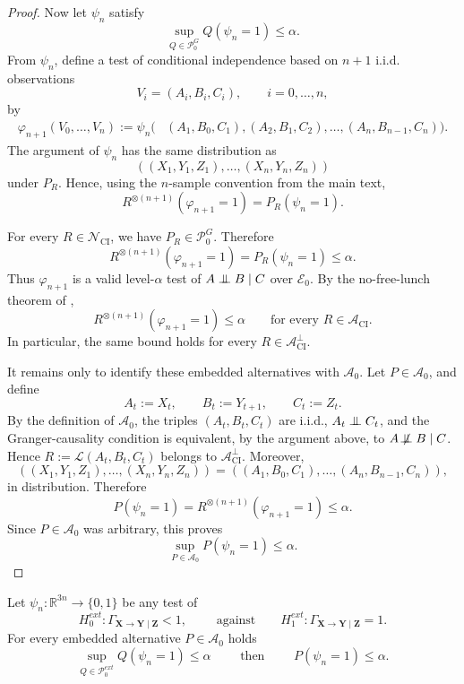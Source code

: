 \documentclass[a4paper,11pt]{article}
\newenvironment{customcorollary}[1]
  {\renewcommand\theinnercustomcorollary{#1}\innercustomcorollary}
  {\endinnercustomcorollary}
\newcommand{\indep}{\perp\kern-5.5pt\perp}
\begin{document}
\begin{proof}
Now let \(\psi_n\) satisfy
\[
    \sup_{Q\in\mathcal P_0^G}Q(\psi_n=1)\le \alpha .
\]
From \(\psi_n\), define a test of conditional independence based on
\(n+1\) i.i.d. observations
\[
    V_i=(A_i,B_i,C_i),\qquad i=0,\ldots,n,
\]
by
\[
\begin{split}
    \varphi_{n+1}(V_0,\ldots,V_n)
    :=
    \psi_n\big(
        &(A_1,B_0,C_1),
          (A_2,B_1,C_2),
          \ldots,
          (A_n,B_{n-1},C_n)
    \big).
\end{split}
\]
The argument of \(\psi_n\) has the same distribution as
\[
    ((X_1,Y_1,Z_1),\ldots,(X_n,Y_n,Z_n))
\]
under \(P_R\). Hence, using the \(n\)-sample convention from the main text,
\[
    R^{\otimes(n+1)}(\varphi_{n+1}=1)
    =
    P_R(\psi_n=1).
\]

For every \(R\in\mathcal N_{\mathrm{CI}}\), we have
\(P_R\in\mathcal P_0^G\). Therefore
\[
    R^{\otimes(n+1)}(\varphi_{n+1}=1)
    =
    P_R(\psi_n=1)
    \le \alpha .
\]
Thus \(\varphi_{n+1}\) is a valid level-\(\alpha\) test of
\(A\indep B\mid C\) over \(\mathcal E_0\). By the no-free-lunch theorem of
\citet{HARDNESS_OF_CONDITIONAL_TESTING},
\[
    R^{\otimes(n+1)}(\varphi_{n+1}=1)
    \le \alpha
    \qquad
    \text{for every }R\in\mathcal A_{\mathrm{CI}} .
\]
In particular, the same bound holds for every
\(R\in\mathcal A_{\mathrm{CI}}^{\perp}\).

It remains only to identify these embedded alternatives with \(\mathcal A_0\).
Let \(P\in\mathcal A_0\), and define
\[
    A_t:=X_t,
    \qquad
    B_t:=Y_{t+1},
    \qquad
    C_t:=Z_t .
\]
By the definition of \(\mathcal A_0\), the triples \((A_t,B_t,C_t)\) are
i.i.d., \(A_t\indep C_t\), and the Granger-causality condition is equivalent,
by the argument above, to \(A\not\!\indep B\mid C\). Hence
\(R:=\mathcal L(A_t,B_t,C_t)\) belongs to
\(\mathcal A_{\mathrm{CI}}^{\perp}\). Moreover,
\[
    ((X_1,Y_1,Z_1),\ldots,(X_n,Y_n,Z_n))
    =
    ((A_1,B_0,C_1),\ldots,(A_n,B_{n-1},C_n)),
\]
in distribution. Therefore
\[
    P(\psi_n=1)
    =
    R^{\otimes(n+1)}(\varphi_{n+1}=1)
    \le \alpha .
\]
Since \(P\in\mathcal A_0\) was arbitrary, this proves
\[
    \sup_{P\in\mathcal A_0}P(\psi_n=1)\le \alpha .
\]
\end{proof}



\begin{customcorollary}{\ref{corollary_no_free_lunch}}
Let \(\psi_n:\mathbb R^{3n}\to\{0,1\}\) be any test of
\[
    H_0^{ext}:
    \Gamma_{\mathbf X\to\mathbf Y\mid\mathbf Z}<1, \qquad \text{ against} \qquad 
    H_1^{ext}:
    \Gamma_{\mathbf X\to\mathbf Y\mid\mathbf Z}=1.
\]
For every embedded alternative \(P\in\mathcal A_0\) holds 
\[
\sup_{Q\in\mathcal P_0^{ext}}Q(\psi_n=1)\le \alpha \qquad 
\text{ then } \qquad 
    P(\psi_n=1)\le \alpha. 
\]
\end{customcorollary}
\end{document}
